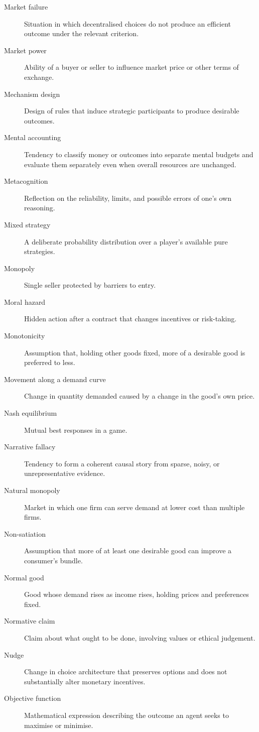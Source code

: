 \begin{description}
  \item[Market failure] Situation in which decentralised choices do not produce an efficient outcome under the relevant criterion.
  \item[Market power] Ability of a buyer or seller to influence market price or other terms of exchange.
  \item[Mechanism design] Design of rules that induce strategic participants to produce desirable outcomes.
  \item[Mental accounting] Tendency to classify money or outcomes into separate mental budgets and evaluate them separately even when overall resources are unchanged.
  \item[Metacognition] Reflection on the reliability, limits, and possible errors of one's own reasoning.
  \item[Mixed strategy] A deliberate probability distribution over a player's available pure strategies.
  \item[Monopoly] Single seller protected by barriers to entry.
  \item[Moral hazard] Hidden action after a contract that changes incentives or risk-taking.
  \item[Monotonicity] Assumption that, holding other goods fixed, more of a desirable good is preferred to less.
  \item[Movement along a demand curve] Change in quantity demanded caused by a change in the good's own price.
  \item[Nash equilibrium] Mutual best responses in a game.
  \item[Narrative fallacy] Tendency to form a coherent causal story from sparse, noisy, or unrepresentative evidence.
  \item[Natural monopoly] Market in which one firm can serve demand at lower cost than multiple firms.
  \item[Non-satiation] Assumption that more of at least one desirable good can improve a consumer's bundle.
  \item[Normal good] Good whose demand rises as income rises, holding prices and preferences fixed.
  \item[Normative claim] Claim about what ought to be done, involving values or ethical judgement.
  \item[Nudge] Change in choice architecture that preserves options and does not substantially alter monetary incentives.
  \item[Objective function] Mathematical expression describing the outcome an agent seeks to maximise or minimise.

\end{description}
